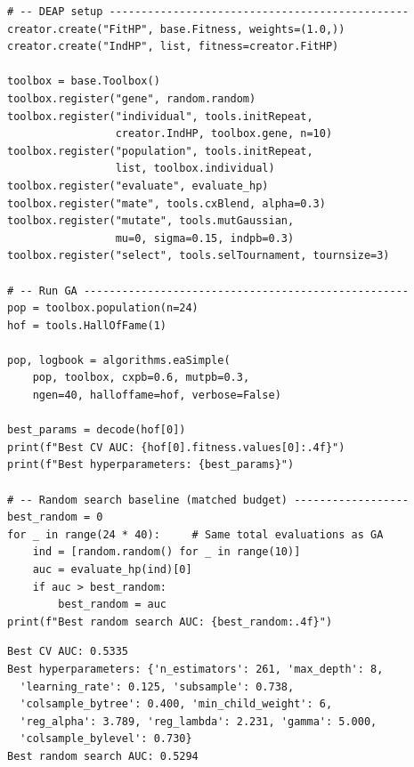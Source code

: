 \begin{verbatim}
# -- DEAP setup -----------------------------------------------
creator.create("FitHP", base.Fitness, weights=(1.0,))
creator.create("IndHP", list, fitness=creator.FitHP)

toolbox = base.Toolbox()
toolbox.register("gene", random.random)
toolbox.register("individual", tools.initRepeat,
                 creator.IndHP, toolbox.gene, n=10)
toolbox.register("population", tools.initRepeat,
                 list, toolbox.individual)
toolbox.register("evaluate", evaluate_hp)
toolbox.register("mate", tools.cxBlend, alpha=0.3)
toolbox.register("mutate", tools.mutGaussian,
                 mu=0, sigma=0.15, indpb=0.3)
toolbox.register("select", tools.selTournament, tournsize=3)

# -- Run GA ---------------------------------------------------
pop = toolbox.population(n=24)
hof = tools.HallOfFame(1)

pop, logbook = algorithms.eaSimple(
    pop, toolbox, cxpb=0.6, mutpb=0.3,
    ngen=40, halloffame=hof, verbose=False)

best_params = decode(hof[0])
print(f"Best CV AUC: {hof[0].fitness.values[0]:.4f}")
print(f"Best hyperparameters: {best_params}")

# -- Random search baseline (matched budget) ------------------
best_random = 0
for _ in range(24 * 40):     # Same total evaluations as GA
    ind = [random.random() for _ in range(10)]
    auc = evaluate_hp(ind)[0]
    if auc > best_random:
        best_random = auc
print(f"Best random search AUC: {best_random:.4f}")
\end{verbatim}

\begin{verbatim}
Best CV AUC: 0.5335
Best hyperparameters: {'n_estimators': 261, 'max_depth': 8,
  'learning_rate': 0.125, 'subsample': 0.738,
  'colsample_bytree': 0.400, 'min_child_weight': 6,
  'reg_alpha': 3.789, 'reg_lambda': 2.231, 'gamma': 5.000,
  'colsample_bylevel': 0.730}
Best random search AUC: 0.5294
\end{verbatim}

